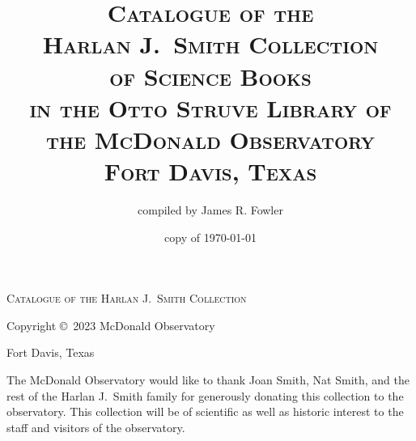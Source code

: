 \documentclass[letterpaper]{book}
\begin{document}
\frontmatter
\thispagestyle{empty}
\vspace*{2.25 in}
\centerline{\textsc{\LARGE Catalogue of the Harlan J.~Smith Collection}}
\newpage

\thispagestyle{empty}
\title{\textsc{Catalogue of the \\
    Harlan J.\ Smith Collection \\
    of Science Books \\
    in the Otto Struve Library of \\
    the McDonald Observatory \\
    Fort Davis, Texas}}
\author{compiled by James R. Fowler}
\date{copy of \today}
\maketitle
\newpage
\thispagestyle{empty}
\vspace*{5 in}
\centerline{Copyright \copyright\ 2023 McDonald Observatory}
\centerline{Fort Davis, Texas}
\newpage

\thispagestyle{empty}
\noindent
The McDonald Observatory would like to thank Joan Smith,
Nat Smith, and the rest of the Harlan J.~Smith family
for generously donating this collection to the observatory.
This collection will be of scientific as well as historic
interest to the staff and visitors of the observatory.
\restoregeometry
\newpage
\end{document}
